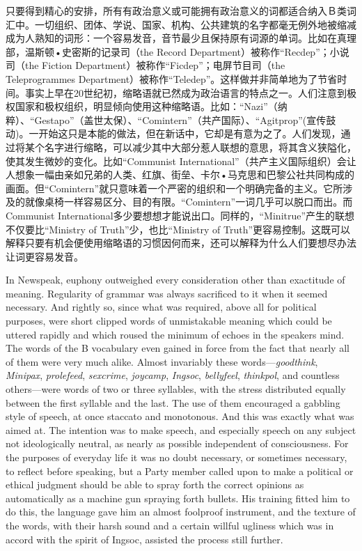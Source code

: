 \begin{paracol}{2}
\switchcolumn

只要得到精心的安排，所有有政治意义或可能拥有政治意义的词都适合纳入Ｂ类词汇中。一切组织、团体、学说、国家、机构、公共建筑的名字都毫无例外地被缩减成为人熟知的词形：一个容易发音，音节最少且保持原有词源的单词。比如在真理部，温斯顿•史密斯的记录司（the
Record Department）被称作``Recdep''；小说司（the Fiction
Department）被称作``Ficdep''；电屏节目司（the Teleprogrammes
Department）被称作``Teledep''。这样做并非简单地为了节省时间。事实上早在20世纪初，缩略语就已然成为政治语言的特点之一。人们注意到极权国家和极权组织，明显倾向使用这种缩略语。比如：``Nazi''（纳粹）、``Gestapo''（盖世太保）、``Comintern''（共产国际）、``Agitprop''(宣传鼓动)。一开始这只是本能的做法，但在新话中，它却是有意为之了。人们发现，通过将某个名字进行缩略，可以减少其中大部分惹人联想的意思，将其含义狭隘化，使其发生微妙的变化。比如``Communist
International''（共产主义国际组织）会让人想象一幅由亲如兄弟的人类、红旗、街垒、卡尔•马克思和巴黎公社共同构成的画面。但``Comintern''就只意味着一个严密的组织和一个明确完备的主义。它所涉及的就像桌椅一样容易区分、目的有限。``Comintern''一词几乎可以脱口而出。而Communist
International多少要想想才能说出口。同样的，``Minitrue''产生的联想不仅要比``Ministry
of Truth''少，也比``Ministry of
Truth''更容易控制。这既可以解释只要有机会便使用缩略语的习惯因何而来，还可以解释为什么人们要想尽办法让词更容易发音。

\switchcolumn*

In Newspeak, euphony outweighed every consideration other than
exactitude of meaning. Regularity of grammar was always sacrificed to it
when it seemed necessary. And rightly so, since what was required, above
all for political purposes, were short clipped words of unmistakable
meaning which could be uttered rapidly and which roused the minimum of
echoes in the speaker\textquotesingle s mind. The words of the B
vocabulary even gained in force from the fact that nearly all of them
were very much alike. Almost invariably these words---\emph{goodthink},
\emph{Minipax}, \emph{prolefeed}, \emph{sexcrime}, \emph{joycamp},
\emph{Ingsoc}, \emph{bellyfeel}, \emph{thinkpol}, and countless
others---were words of two or three syllables, with the stress
distributed equally between the first syllable and the last. The use of
them encouraged a gabbling style of speech, at once staccato and
monotonous. And this was exactly what was aimed at. The intention was to
make speech, and especially speech on any subject not ideologically
neutral, as nearly as possible independent of consciousness. For the
purposes of everyday life it was no doubt necessary, or sometimes
necessary, to reflect before speaking, but a Party member called upon to
make a political or ethical judgment should be able to spray forth the
correct opinions as automatically as a machine gun spraying forth
bullets. His training fitted him to do this, the language gave him an
almost foolproof instrument, and the texture of the words, with their
harsh sound and a certain willful ugliness which was in accord with the
spirit of Ingsoc, assisted the process still further.


\end{paracol}
